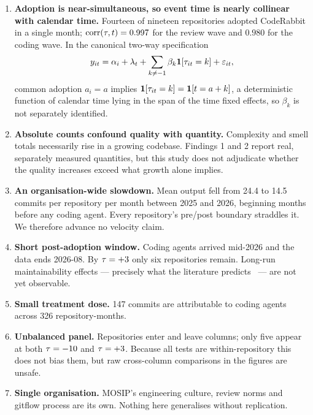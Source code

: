 \documentclass[11pt,a4paper]{article}
\begin{document}
\begin{enumerate}
\item \textbf{Adoption is near-simultaneous, so event time is nearly collinear
with calendar time.} Fourteen of nineteen repositories adopted CodeRabbit in a
single month; $\mathrm{corr}(\tau,t)=0.997$ for the review wave and $0.980$ for
the coding wave. In the canonical two-way specification
\begin{equation}
  y_{it} = \alpha_i + \lambda_t
         + \sum_{k \neq -1} \beta_k \mathbf{1}[\tau_{it}=k] + \varepsilon_{it},
  \label{eq:twfe}
\end{equation}
common adoption $a_i = a$ implies
$\mathbf{1}[\tau_{it}=k] = \mathbf{1}[t=a+k]$, a deterministic function of
calendar time lying in the span of the time fixed effects, so $\beta_k$ is not
separately identified.

\item \textbf{Absolute counts confound quality with quantity.} Complexity and
smell totals necessarily rise in a growing codebase. Findings 1 and 2 report
real, separately measured quantities, but this study does not adjudicate
whether the quality increases exceed what growth alone implies.

\item \textbf{An organisation-wide slowdown.} Mean output fell from 24.4 to
14.5 commits per repository per month between 2025 and 2026, beginning months
before any coding agent. Every repository's pre/post boundary straddles it. We
therefore advance no velocity claim.

\item \textbf{Short post-adoption window.} Coding agents arrived mid-2026 and
the data ends 2026-08. By $\tau=+3$ only six repositories remain. Long-run
maintainability effects --- precisely what the literature
predicts~\cite{he2026speed} --- are not yet observable.

\item \textbf{Small treatment dose.} 147 commits are attributable to coding
agents across 326 repository-months.

\item \textbf{Unbalanced panel.} Repositories enter and leave columns; only
five appear at both $\tau=-10$ and $\tau=+3$. Because all tests are
within-repository this does not bias them, but raw cross-column comparisons in
the figures are unsafe.

\item \textbf{Single organisation.} MOSIP's engineering culture, review norms
and gitflow process are its own. Nothing here generalises without replication.
\end{enumerate}
\end{document}
